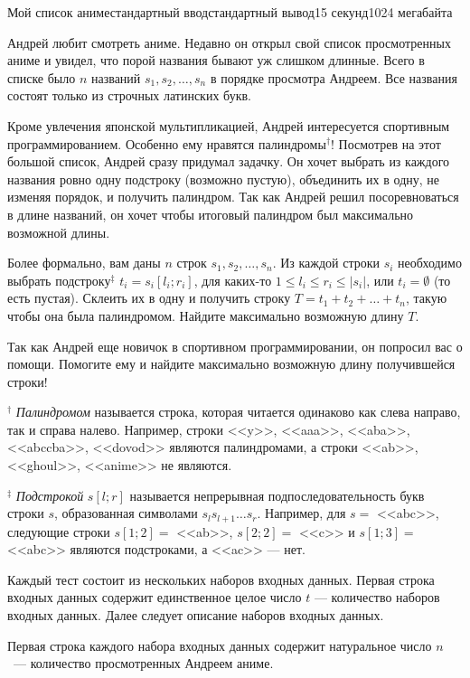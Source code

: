 \begin{problem}{Мой список аниме}{стандартный ввод}{стандартный вывод}{15 секунд}{1024 мегабайта}

    Андрей любит смотреть аниме. Недавно он открыл свой список просмотренных аниме и увидел, что порой названия бывают уж слишком длинные. Всего в списке было $n$ названий $s_1, s_2, \ldots, s_n$ в порядке просмотра Андреем. Все названия состоят только из строчных латинских букв.

    Кроме увлечения японской мультипликацией, Андрей интересуется спортивным программированием. Особенно ему нравятся палиндромы$^{\dagger}$! Посмотрев на этот большой список, Андрей сразу придумал задачку. Он хочет выбрать из каждого названия ровно одну подстроку (возможно пустую), объединить их в одну, не изменяя порядок, и получить палиндром. Так как Андрей решил посоревноваться в длине названий, он хочет чтобы итоговый палиндром был максимально возможной длины.

    Более формально, вам даны $n$ строк $s_1, s_2, \ldots, s_n$. Из каждой строки $s_i$ необходимо выбрать подстроку{$^\ddagger$} $t_i = s_i[l_i; r_i]$, для каких-то $1 \leq l_i \leq r_i \leq |s_i|$, или $t_i = \emptyset$ (то есть пустая). Склеить их в одну и получить строку $T = t_1 + t_2 + \ldots + t_n$, такую чтобы она была палиндромом. Найдите максимально возможную длину $T$.

    Так как Андрей еще новичок в спортивном программировании, он попросил вас о помощи. Помогите ему и найдите максимально возможную длину получившейся строки!


    $^\dagger$ \textit{Палиндромом} называется строка, которая читается одинаково как слева направо, так и справа налево. Например, строки <<y>>, <<aaa>>, <<aba>>, <<abccba>>, <<dovod>> являются палиндромами, а строки <<ab>>, <<ghoul>>, <<anime>> не являются.

    $^\ddagger$ \textit{Подстрокой} $s[l; r]$ называется непрерывная подпоследовательность букв строки $s$, образованная символами $s_{l} s_{l + 1} \ldots s_{r}$. Например, для $s =$ <<abc>>, следующие строки $s[1; 2] =$ <<ab>>, $s[2; 2] =$ <<c>> и $s[1;3] =$ <<abc>> являются подстроками, а <<ac>> --- нет.


    Каждый тест состоит из нескольких наборов входных данных. Первая строка входных данных содержит единственное целое число $t$ --- количество наборов входных данных. Далее следует описание наборов входных данных.

    Первая строка каждого набора входных данных содержит натуральное число $n$ ~--- количество просмотренных Андреем аниме.


\end{problem}
